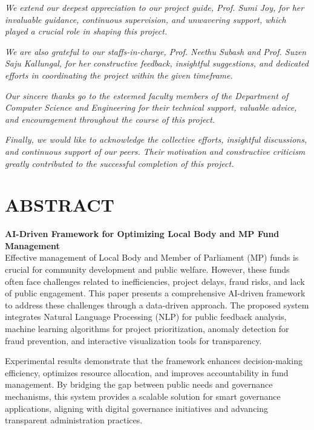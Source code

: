 \documentclass[12pt,a4paper]{report}
\begin{document}
\textit{We extend our deepest appreciation to our project guide, Prof. Sumi Joy, for her invaluable guidance, continuous supervision, and unwavering support, which played a crucial role in shaping this project.} 

\textit{We are also grateful to our staffs-in-charge, Prof. Neethu Subash and Prof. Suzen Saju Kallungal, for her constructive feedback, insightful suggestions, and dedicated efforts in coordinating the project within the given timeframe.} 
    
\textit{Our sincere thanks go to the esteemed faculty members of the Department of Computer Science and Engineering for their technical support, valuable advice, and encouragement throughout the course of this project.} 
    
\textit{Finally, we would like to acknowledge the collective efforts, insightful discussions, and continuous support of our peers. Their motivation and constructive criticism greatly contributed to the successful completion of this project.}
\chapter*{ABSTRACT}
\textbf{AI-Driven Framework for Optimizing Local Body and MP Fund Management}\\[0.5cm]
\indent Effective management of Local Body and Member of Parliament (MP) funds is crucial for community development and public welfare. However, these funds often face challenges related to inefficiencies, project delays, fraud risks, and lack of public engagement. This paper presents a comprehensive AI-driven framework to address these challenges through a data-driven approach. The proposed system integrates Natural Language Processing (NLP) for public feedback analysis, machine learning algorithms for project prioritization, anomaly detection for fraud prevention, and interactive visualization tools for transparency.

Experimental results demonstrate that the framework enhances decision-making efficiency, optimizes resource allocation, and improves accountability in fund management. By bridging the gap between public needs and governance mechanisms, this system provides a scalable solution for smart governance applications, aligning with digital governance initiatives and advancing transparent administration practices.


\renewcommand{\cftchappresnum}{Chapter }
\setlength{\cftchapnumwidth}{6.5em}
\setlength{\cftchapindent}{0em}
\clearpage
\pagestyle{plain}
\renewcommand{\contentsname}{CONTENTS} %
\tableofcontents
{} %
\clearpage
\end{document}
